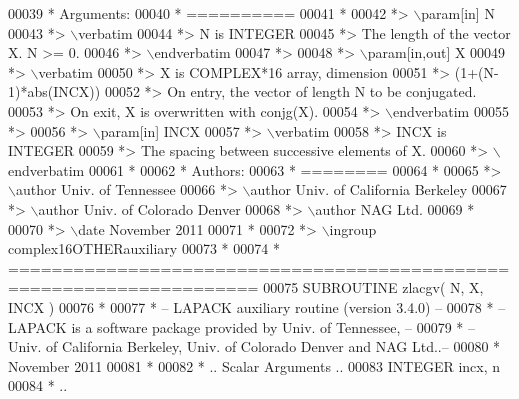 \begin{DoxyCode}
00039 \textcolor{comment}{*  Arguments:}
00040 \textcolor{comment}{*  ==========}
00041 \textcolor{comment}{*}
00042 \textcolor{comment}{*> \(\backslash\)param[in] N}
00043 \textcolor{comment}{*> \(\backslash\)verbatim}
00044 \textcolor{comment}{*>          N is INTEGER}
00045 \textcolor{comment}{*>          The length of the vector X.  N >= 0.}
00046 \textcolor{comment}{*> \(\backslash\)endverbatim}
00047 \textcolor{comment}{*>}
00048 \textcolor{comment}{*> \(\backslash\)param[in,out] X}
00049 \textcolor{comment}{*> \(\backslash\)verbatim}
00050 \textcolor{comment}{*>          X is COMPLEX*16 array, dimension}
00051 \textcolor{comment}{*>                         (1+(N-1)*abs(INCX))}
00052 \textcolor{comment}{*>          On entry, the vector of length N to be conjugated.}
00053 \textcolor{comment}{*>          On exit, X is overwritten with conjg(X).}
00054 \textcolor{comment}{*> \(\backslash\)endverbatim}
00055 \textcolor{comment}{*>}
00056 \textcolor{comment}{*> \(\backslash\)param[in] INCX}
00057 \textcolor{comment}{*> \(\backslash\)verbatim}
00058 \textcolor{comment}{*>          INCX is INTEGER}
00059 \textcolor{comment}{*>          The spacing between successive elements of X.}
00060 \textcolor{comment}{*> \(\backslash\)endverbatim}
00061 \textcolor{comment}{*}
00062 \textcolor{comment}{*  Authors:}
00063 \textcolor{comment}{*  ========}
00064 \textcolor{comment}{*}
00065 \textcolor{comment}{*> \(\backslash\)author Univ. of Tennessee }
00066 \textcolor{comment}{*> \(\backslash\)author Univ. of California Berkeley }
00067 \textcolor{comment}{*> \(\backslash\)author Univ. of Colorado Denver }
00068 \textcolor{comment}{*> \(\backslash\)author NAG Ltd. }
00069 \textcolor{comment}{*}
00070 \textcolor{comment}{*> \(\backslash\)date November 2011}
00071 \textcolor{comment}{*}
00072 \textcolor{comment}{*> \(\backslash\)ingroup complex16OTHERauxiliary}
00073 \textcolor{comment}{*}
00074 \textcolor{comment}{*  =====================================================================}
00075 \textcolor{keyword}{      SUBROUTINE }zlacgv( N, X, INCX )
00076 \textcolor{comment}{*}
00077 \textcolor{comment}{*  -- LAPACK auxiliary routine (version 3.4.0) --}
00078 \textcolor{comment}{*  -- LAPACK is a software package provided by Univ. of Tennessee,    --}
00079 \textcolor{comment}{*  -- Univ. of California Berkeley, Univ. of Colorado Denver and NAG Ltd..--}
00080 \textcolor{comment}{*     November 2011}
00081 \textcolor{comment}{*}
00082 \textcolor{comment}{*     .. Scalar Arguments ..}
00083       \textcolor{keywordtype}{INTEGER}            incx, n
00084 \textcolor{comment}{*     ..}

\end{DoxyCode}
